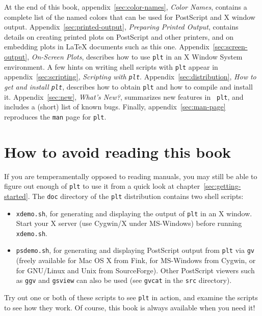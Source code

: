 \documentclass{book}
\begin{document}
%
%
%
%
%
%
At the end of this book, appendix~\ref{sec:color-names}, {\em Color Names},
contains a complete list of the named colors that can be used for PostScript
and X window output.  Appendix~\ref{sec:printed-output}, {\em Preparing Printed
Output}, contains details on creating printed plots on PostScript and other
printers, and on embedding plots in \LaTeX{} documents such as this one.
Appendix~\ref{sec:screen-output}, {\em On-Screen Plots}, describes how to use
{\tt plt} in an X Window System environment.  A few hints on writing shell
scripts with {\tt plt} appear in appendix~\ref{sec:scripting}, {\em Scripting
with {\tt plt}}.  Appendix~\ref{sec:distribution}, {\em How to get and install
{\tt plt}}, describes how to obtain {\tt plt} and how to compile and install
it.  Appendix~\ref{sec:new}, {\em What's New?}, summarizes new features in {\tt
plt}, and includes a (short) list of known bugs.  Finally,
appendix~\ref{sec:man-page} reproduces the {\tt man} page for {\tt plt}.
\newpage
\section{How to avoid reading this book\label{sec:quick}}

If you are temperamentally opposed to reading manuals, you may still
be able to figure out enough of {\tt plt} to use it from a quick look
at chapter~\ref{sec:getting-started}.  The {\tt doc} directory of the
{\tt plt} distribution contains two shell scripts:
\begin{itemize}
\item
{\tt xdemo.sh}, for generating and displaying the output of {\tt plt} in an X
  window.  Start your X server (use Cygwin/X under MS-Windows) before
  running {\tt xdemo.sh}.

\item
{\tt psdemo.sh}, for generating and displaying PostScript output from {\tt plt}
via {\tt gv} (freely available for Mac OS X from Fink, for MS-Windows from
Cygwin, or for GNU/Linux and Unix from SourceForge).  Other PostScript viewers
such as {\tt ggv} and {\tt gsview} can also be used (see {\tt gvcat} in the
{\tt src} directory).
\end{itemize}

Try out one or both of these scripts to see {\tt plt} in action, and
examine the scripts to see how they work.  Of course, this book is
always available when you need it!
\end{document}
